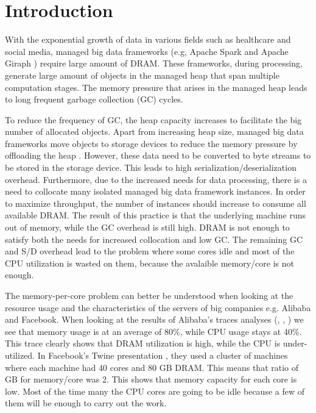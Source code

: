 \section{Introduction}
\label{sec:intro}

With the exponential growth of data in various fields such as
healthcare and social media, managed big data frameworks (e.g, Apache
Spark \cite{Spark} and Apache Giraph \cite{Giraph}) require large
amount of DRAM. These frameworks, during processing, generate large
amount of objects in the managed heap that span multiple computation
stages. The memory pressure that arises in the managed heap leads to
 long
frequent garbage collection (GC) cycles.

To reduce the frequency of GC, the heap capacity increases to
facilitate the big number of allocated objects.  Apart from increasing
heap size, managed big data frameworks move objects to storage devices
to reduce the memory pressure by offloading the heap . However, these
data need to be converted to byte streams to be stored in the storage
device. This leads to high serialization/deserialization overhead.
 Furthermore, due to the increased needs for data processing, there is
a need to collocate many isolated managed big data framework
instances. In order to maximize throughput, the number of instances
should increase to consume all available DRAM. The result of this
practice is that the underlying machine runs out of memory, while the
GC overhead is still high. DRAM is not enough to satisfy both the
needs for increased collocation and low GC. The remaining GC and S/D
overhead lead to the problem where some cores idle and most of the CPU
utilization is wasted on them, because the avalaible memory/core is
not enough. 

The memory-per-core problem can better be understood when looking at
the resource usage and the characteristics of the servers of big
companies e.g. Alibaba and Facebook. When looking at the results of
Alibaba's traces analyses (\cite{Alibaba}, \cite{Alibaba1},
\cite{Alibabacolocated}) we see that memory usage is at an average of
80\%, while CPU usage stays at 40\%. This trace clearly shows that
DRAM utilization is high, while the CPU is under-utilized. In
Facebook's Twine presentation \cite{Twine}, they used a cluster of
machines where each machine had 40 cores and 80 GB DRAM. This means
that ratio of GB for memory/core was 2. This shows that memory
capacity for each core is low. Most of the time many the CPU cores are
going to be idle because a few of them will be enough to carry out the
work.

